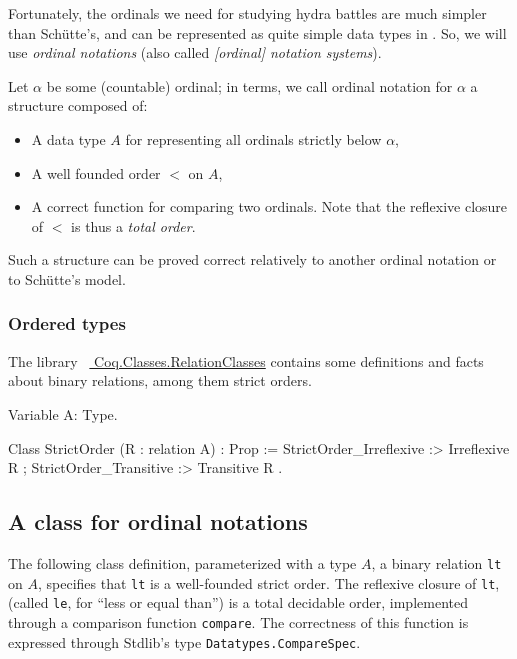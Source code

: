 \documentclass[a4paper]{book}
\begin{document}
Fortunately, the ordinals we need for  studying hydra battles are much simpler than Schütte's, and can be represented as quite simple data types in \gallina. So, we will use \emph{ordinal notations} (also called \emph{[ordinal] notation systems}). 

Let $\alpha$ be some (countable) ordinal; 
in \coq{} terms, we call ordinal notation for $\alpha$ a structure composed 
of:
\begin{itemize}
\item A data type $A$ for representing all ordinals strictly below $\alpha$,
\item A well founded order $<$ on $A$, 
\item A correct function for comparing two ordinals. Note  that the reflexive closure of $<$ is thus a \emph{total order}.
\end{itemize}


Such a structure can be proved correct relatively to another ordinal notation or
to Schütte's model.




\subsubsection*{Ordered types}

The library ~\href{https://coq.inria.fr/distrib/current/stdlib/Coq.Classes.RelationClasses.html}{%
Coq.Classes.RelationClasses} contains some definitions and facts about binary relations, among them strict orders.


\begin{Coqsrc}
Variable A: Type.

  Class StrictOrder (R : relation A) : Prop := {
    StrictOrder_Irreflexive :> Irreflexive R ;
    StrictOrder_Transitive :> Transitive R }.
\end{Coqsrc}



\subsection{A class for ordinal notations}

The following class definition, parameterized with a type $A$, a binary relation \texttt{lt} on $A$, specifies that \texttt{lt} is a well-founded strict order. The reflexive closure of \texttt{lt}, (called \texttt{le}, for ``less  or equal than'') is a total decidable order, implemented through a comparison function \texttt{compare}.  The correctness of this function is expressed through Stdlib's type 
\texttt{Datatypes.CompareSpec}.
\end{document}
